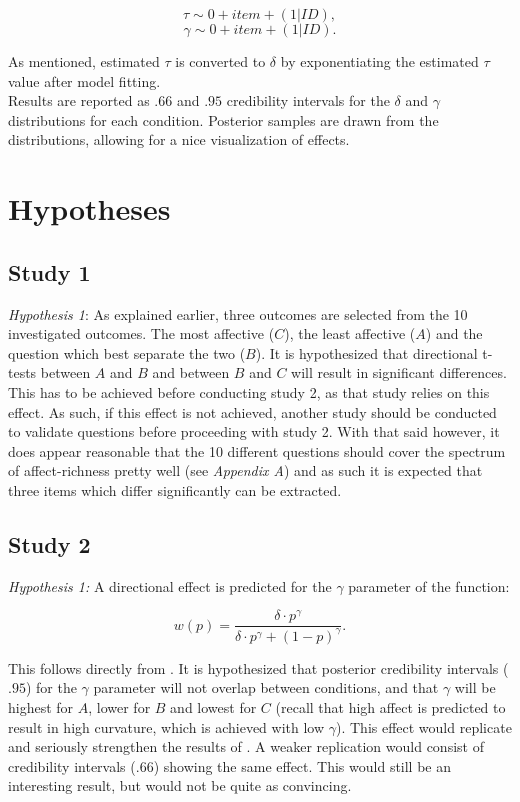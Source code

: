 \documentclass[12pt]{article}
\begin{document}
 \[
	 \tau \sim 0 + item + (1|ID),
\]
\[
	\gamma \sim 0 + item + (1|ID)
.\]

As mentioned, estimated $\tau$ is converted
to $\delta$ by exponentiating the estimated
$\tau$ value after model fitting. \\

Results are reported as $.66$ and $.95$
credibility intervals
for the $\delta$ and $\gamma$ distributions
for each condition. Posterior samples
are drawn from the distributions, allowing
for a nice visualization of effects.

\section{Hypotheses}

\subsection{Study 1}
\emph{Hypothesis 1}: As explained earlier,
three outcomes are selected from the
10 investigated outcomes. The most
affective ($C$), the least affective ($A$) and the
question which best separate the two ($B$).
It is hypothesized that directional t-tests
between $A$ and  $B$ and between  $B$ and  $C$
will result in significant differences.
This has to be achieved before conducting
study 2, as that study relies on this effect.
As such, if this effect is not achieved, another
study should be conducted to validate questions
before proceeding with study 2. With that said
however, it does appear reasonable that
the 10 different questions should cover the
spectrum of affect-richness pretty well
(see \emph{Appendix A}) and as such it is
expected that three items which differ significantly
can be extracted.

\subsection{Study 2}
\emph{Hypothesis 1:} A directional effect is
predicted for the $\gamma$ parameter of the function:

\[
	w(p) = \frac{\delta \cdot p^{\gamma}}
	{\delta \cdot p^{\gamma}+(1-p)^{\gamma}}
.\]

This follows directly from \textcite{
rottenstreich2001money}.
It is hypothesized that
posterior credibility intervals ($.95$)
for the $\gamma$
parameter will not overlap between
conditions, and that $\gamma$ will be highest for
$A$, lower for  $B$ and lowest for  $C$
(recall that high affect is predicted to
result in high curvature, which is achieved
with low $\gamma$). This effect would replicate
and seriously strengthen the results of
\textcite{rottenstreich2001money}. A
weaker replication would consist of
credibility intervals ($.66$) showing the
same effect. This would still be an
interesting result, but would not be
quite as convincing. \\
\end{document}
